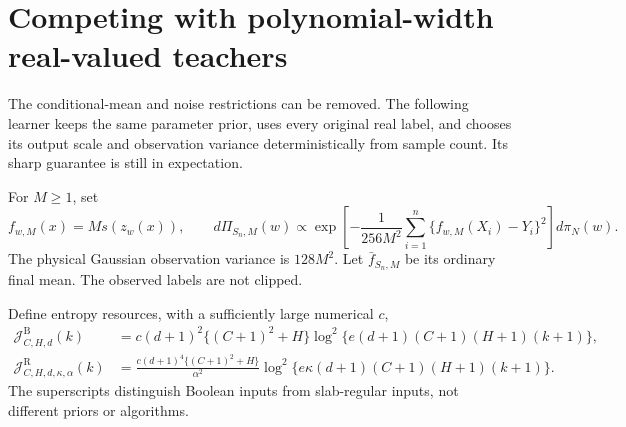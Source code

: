 \section{Competing with polynomial-width real-valued teachers}
\label{sec:finite-variance-main}
The conditional-mean and noise restrictions can be removed. The following learner keeps the same parameter prior, uses every original real label, and chooses its output scale and observation variance deterministically from sample count. Its sharp guarantee is still in expectation.

For $M\ge1$, set
\[
 f_{w,M}(x)=M s(z_w(x)),\qquad
 d\Pi_{S_n,M}(w)\propto
 \exp\left[-\frac1{256M^2}\sum_{i=1}^n
                   \{f_{w,M}(X_i)-Y_i\}^2\right]d\pi_N(w).
\]
The physical Gaussian observation variance is $128M^2$. Let $\bar f_{S_n,M}$ be its ordinary final mean. The observed labels are not clipped.

Define entropy resources, with a sufficiently large numerical $c$,
\begin{align*}
 \mathcal J^{\mathrm B}_{C,H,d}(k)
 &=c(d+1)^2\{(C+1)^2+H\}
      \log^2\{e(d+1)(C+1)(H+1)(k+1)\},\\
 \mathcal J^{\mathrm R}_{C,H,d,\kappa,\alpha}(k)
 &=\frac{c(d+1)^4\{(C+1)^2+H\}}{\alpha^2}
      \log^2\{e\kappa(d+1)(C+1)(H+1)(k+1)\}.
\end{align*}
The superscripts distinguish Boolean inputs from slab-regular inputs, not different priors or algorithms.

